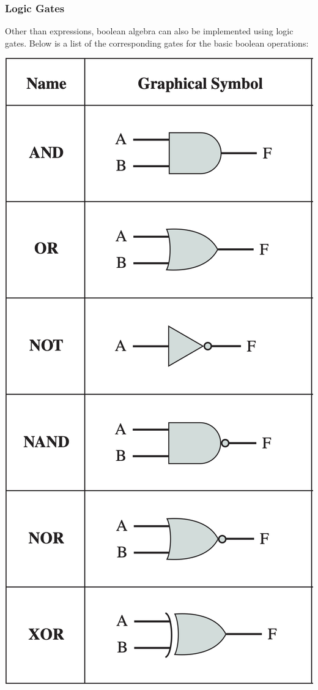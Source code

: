 \subsubsection{Logic Gates}

Other than expressions, boolean algebra can also be implemented using logic gates.
Below is a list of the corresponding gates for the basic boolean operations:

\begin{center}
    \includegraphics[scale=0.3]{chaps/digital-logic/logic-gates.png}
\end{center}

